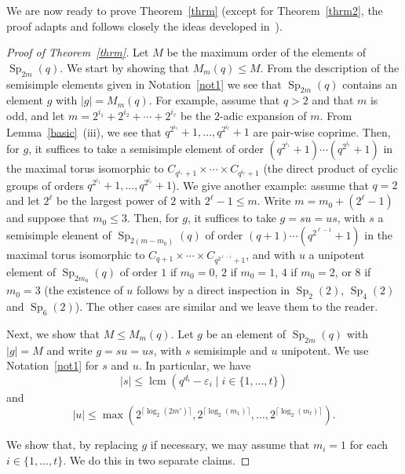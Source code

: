 \documentclass{amsart}
\begin{document}
We are now ready to prove Theorem~\ref{thrm} (except for Theorem~\ref{thrm2}, the proof adapts and follows closely the ideas developed in~\cite[Section~$2$]{DGPS}). 
\begin{proof}[Proof of Theorem~\ref{thrm}]
Let $M$ be the maximum order of the elements of ${\mathop{\mathrm{Sp}}}_{2m}(q)$. We start by showing that $M_m(q)\leq M$. From the description of the semisimple elements given in Notation~\ref{not1} we see that ${\mathop{\mathrm{Sp}}}_{2m}(q)$ contains an element $g$ with $|g|=M_m(q)$. For example, assume that $q>2$ and that $m$ is odd, and let $m=2^{i_1}+2^{i_2}+\cdots +2^{i_\ell}$ be the $2$-adic expansion of $m$. From Lemma~\ref{basic}~(iii), we see that $q^{2^{i_1}}+1,\ldots,q^{2^{i_\ell}}+1$ are pair-wise coprime. Then, for $g$, it suffices to take a semisimple element of order $(q^{2^{i_1}}+1)\cdots (q^{2^{i_\ell}}+1)$ in the maximal torus isomorphic to $C_{q^{i_1}+1}\times \cdots \times C_{q^{i_\ell}+1}$ (the direct product of cyclic groups of orders $q^{2^{i_1}}+1,\ldots,q^{2^{i_\ell}}+1$). We give another example: assume that $q=2$ and let $2^\ell$ be the largest power of $2$ with $2^\ell-1\leq m$. Write  $m=m_0+(2^\ell-1)$ and suppose that $m_0\leq 3$. Then, for $g$, it suffices to take $g=su=us$, with $s$  a semisimple element  of ${\mathop{\mathrm{Sp}}}_{2(m-m_0)}(q)$ of order $(q+1)\cdots (q^{2^{\ell-1}}+1)$ in the maximal torus isomorphic to $C_{q+1}\times \cdots \times C_{q^{2^{\ell-1}}+1}$, and with $u$ a unipotent element of ${\mathop{\mathrm{Sp}}}_{2m_0}(q)$ of order $1$ if $m_0=0$, $2$ if $m_0=1$, $4$ if $m_0=2$,  or $8$ if $m_0=3$ (the existence of $u$ follows by a direct inspection in ${\mathop{\mathrm{Sp}}}_2(2)$, ${\mathop{\mathrm{Sp}}}_4(2)$ and ${\mathop{\mathrm{Sp}}}_6(2)$). The other cases are similar and we leave them to the reader. 

Next, we show that $M\leq M_m(q)$. Let $g$ be an element of ${\mathop{\mathrm{Sp}}}_{2m}(q)$ with $|g|=M$ and write $g=su=us$, with $s$ semisimple and $u$ unipotent. We use Notation~\ref{not1} for $s$ and $u$. In particular, we have
$$|s|\leq {\mathop{\mathrm{lcm}}}(q^{d_i}-\varepsilon_i\mid i\in \{1,\ldots,t\})$$
and
\begin{equation}\label{equ}
|u|\leq \max(2^{\lceil \log_2(2m')\rceil},2^{\lceil \log_2(m_1)\rceil},\ldots, 2^{\lceil \log_2(m_t)\rceil}).
\end{equation}

We show that, by replacing $g$ if necessary, we may assume that $m_i=1$ for each $i\in \{1,\ldots,t\}$. We do this in two separate claims.


\end{proof}
\end{document}
